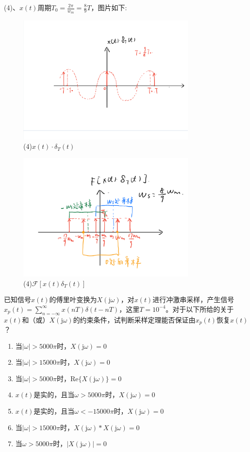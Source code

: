 \documentclass[answers]{exam}
\begin{document}
\begin{questions}
\newpage
(4)、$x(t)$周期$T_0=\frac{2\pi}{w_m}=\frac{8}{9}T$，图片如下:\\
\begin{figure}[h]
	\centering
	\includegraphics[width=0.8\textwidth,height=0.25\textheight]{pics/p2-4-1.PNG}
	\caption{(4)$x(t)\cdot\delta_T(t)$}
\end{figure}
\begin{figure}[h]
	\centering
	\includegraphics[width=0.8\textwidth,height=0.4\textheight]{pics/p2-4-2.PNG}
	\caption{(4)$\mathcal{F}[x(t)\delta_T(t)]$}
\end{figure}

\newpage
\question 已知信号$x(t)$的傅里叶变换为$X(\text{j}\omega)$，对$x(t)$进行冲激串采样，产生信号$x_{p}(t)=\sum_{n=-\infty}^{\infty}x(nT)\delta(t-nT)$，这里$T=10^{-4}$。对于以下所给的关于$x(t)$和（或）$X(\text{j}\omega)$的约束条件，试判断采样定理能否保证由$x_{p}(t)$恢复$x(t)$？
\begin{enumerate}[(1)]
\item 当$|\omega|>5000\pi$时，$X(\text{j}\omega)=0$
\item 当$|\omega|>15000\pi$时，$X(\text{j}\omega)=0$
\item 当$|\omega|>5000\pi$时，$\text{Re}\{X(\text{j}\omega)\}=0$
\item $x(t)$是实的，且当$\omega>5000\pi$时，$X(\text{j}\omega)=0$
\item $x(t)$是实的，且当$\omega<-15000\pi$时，$X(\text{j}\omega)=0$
\item 当$|\omega|>15000\pi$时，$X(\text{j}\omega)\ast X(\text{j}\omega)=0$
\item 当$\omega>5000\pi$时，$|X(\text{j}\omega)|=0$
\end{enumerate}

\end{questions}
\end{document}
